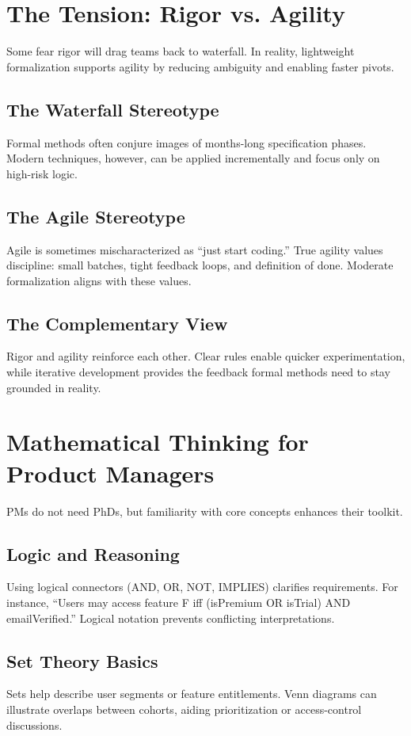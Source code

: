 \section{The Tension: Rigor vs. Agility}
\label{sec:rigor-agility}

Some fear rigor will drag teams back to waterfall. In reality, lightweight formalization supports agility by reducing ambiguity and enabling faster pivots.

\subsection{The Waterfall Stereotype}
Formal methods often conjure images of months-long specification phases. Modern techniques, however, can be applied incrementally and focus only on high-risk logic.

\subsection{The Agile Stereotype}
Agile is sometimes mischaracterized as ``just start coding.'' True agility values discipline: small batches, tight feedback loops, and definition of done. Moderate formalization aligns with these values.

\subsection{The Complementary View}
Rigor and agility reinforce each other. Clear rules enable quicker experimentation, while iterative development provides the feedback formal methods need to stay grounded in reality.

\section{Mathematical Thinking for Product Managers}
\label{sec:math-for-pms}

PMs do not need PhDs, but familiarity with core concepts enhances their toolkit.

\subsection{Logic and Reasoning}
Using logical connectors (AND, OR, NOT, IMPLIES) clarifies requirements. For instance, ``Users may access feature F iff (isPremium OR isTrial) AND emailVerified.'' Logical notation prevents conflicting interpretations.

\subsection{Set Theory Basics}
Sets help describe user segments or feature entitlements. Venn diagrams can illustrate overlaps between cohorts, aiding prioritization or access-control discussions.


